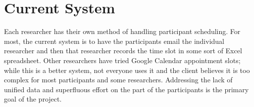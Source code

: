 \section{Current System}
Each researcher has their own method of handling participant scheduling. For most, the current system is to have the participants email the individual researcher and then that researcher records the time slot in some sort of Excel spreadsheet. Other researchers have tried Google Calendar appointment slots; while this is a better system, not everyone uses it and the client believes it is too complex for most participants and some researchers.  Addressing the lack of unified data and superfluous effort on the part of the participants is the primary goal of the project.

